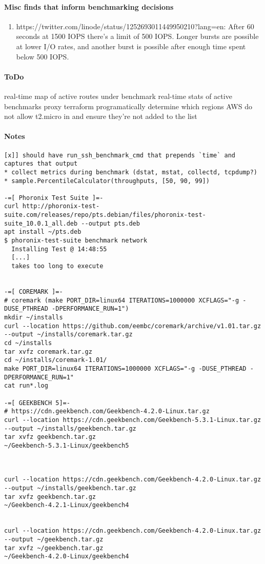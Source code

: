 \documentclass[11pt]{article}
\begin{document}
    \paragraph{Misc finds that inform benchmarking decisions}
    \begin{enumerate}
        \item https://twitter.com/linode/status/1252693011449950210?lang=en: After 60 seconds at 1500 IOPS there's a limit of 500 IOPS. Longer bursts are possible at lower I/O rates, and another burst is possible after enough time spent below 500 IOPS.
    \end{enumerate}

    \paragraph{ToDo}
    \begin{enumerate}
        \todo[color=green] real-time map of active routes under benchmark
        \todo real-time stats of active benchmarks
        \todo proxy terraform
        \todo programatically determine which regions AWS do not allow t2.micro in and ensure they're not added to the list
    \end{enumerate}

    \paragraph{Notes}
\begin{lstlisting}
[x]] should have run_ssh_benchmark_cmd that prepends `time` and captures that output
* collect metrics during benchmark (dstat, mstat, collectd, tcpdump?)
* sample.PercentileCalculator(throughputs, [50, 90, 99])

-=[ Phoronix Test Suite ]=-
curl http://phoronix-test-suite.com/releases/repo/pts.debian/files/phoronix-test-suite_10.0.1_all.deb --output pts.deb
apt install ~/pts.deb
$ phoronix-test-suite benchmark network
  Installing Test @ 14:48:55
  [...]
  takes too long to execute


-=[ COREMARK ]=-
# coremark (make PORT_DIR=linux64 ITERATIONS=1000000 XCFLAGS="-g -DUSE_PTHREAD -DPERFORMANCE_RUN=1")
mkdir ~/installs
curl --location https://github.com/eembc/coremark/archive/v1.01.tar.gz --output ~/installs/coremark.tar.gz
cd ~/installs
tar xvfz coremark.tar.gz
cd ~/installs/coremark-1.01/
make PORT_DIR=linux64 ITERATIONS=1000000 XCFLAGS="-g -DUSE_PTHREAD -DPERFORMANCE_RUN=1"
cat run*.log

-=[ GEEKBENCH 5]=-
# https://cdn.geekbench.com/Geekbench-4.2.0-Linux.tar.gz
curl --location https://cdn.geekbench.com/Geekbench-5.3.1-Linux.tar.gz --output ~/installs/geekbench.tar.gz
tar xvfz geekbench.tar.gz
~/Geekbench-5.3.1-Linux/geekbench5



curl --location https://cdn.geekbench.com/Geekbench-4.2.0-Linux.tar.gz --output ~/installs/geekbench.tar.gz
tar xvfz geekbench.tar.gz
~/Geekbench-4.2.1-Linux/geekbench4


curl --location https://cdn.geekbench.com/Geekbench-4.2.0-Linux.tar.gz --output ~/geekbench.tar.gz
tar xvfz ~/geekbench.tar.gz
~/Geekbench-4.2.0-Linux/geekbench4
\end{lstlisting}
\end{document}
